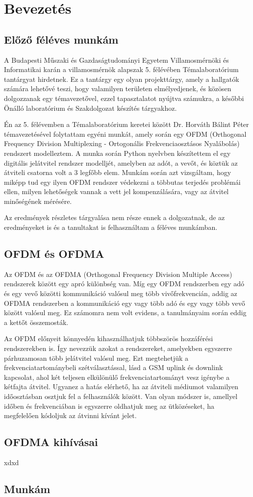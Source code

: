 \chapter{Bevezetés}

\section{Előző féléves munkám}

A Budapesti Műszaki és Gazdaságtudományi Egyetem Villamosmérnöki és Informatikai karán a villamosmérnök alapszak 5. félévében Témalaboratórium tantárgyat hirdetnek.
Ez a tantárgy egy olyan projekttárgy, amely a hallgatók számára lehetővé teszi, hogy valamilyen területen elmélyedjenek, és közösen dolgozzanak egy témavezetővel, ezzel tapasztalatot nyújtva számukra, a későbbi Önálló laboratórium és Szakdolgozat készítés tárgyakhoz.

Én az 5. félévemben a Témalaboratórium keretei között Dr. Horváth Bálint Péter témavezetésével folytattam egyéni munkát, amely során egy OFDM (Orthogonal Frequency Division Multiplexing - Ortogonális Frekvenciaosztásos Nyalábolás) rendszert modelleztem. A munka során Python nyelvben készítettem el egy digitális jelátvitel rendszer modelljét, amelyben az adót, a vevőt, és köztük az átviteli csatorna volt a 3 legfőbb elem. Munkám során azt vizsgáltam, hogy miképp tud egy ilyen OFDM rendszer védekezni a többutas terjedés problémái ellen, milyen lehetőségek vannak a vett jel kompenzálására, vagy az átvitel minőségének mérésére.

Az eredmények részletes tárgyalása nem része ennek a dolgozatnak, de az eredményeket is és a tanultakat is felhasználtam a féléves munkámban.

\section{OFDM és OFDMA}

Az OFDM és az OFDMA (Orthogonal Frequency Division Multiple Access) rendszerek között egy apró különbség van. Míg egy OFDM rendszerben egy adó és egy vevő közötti kommunikáció valósul meg több vivőfrekvencián, addig az OFDMA rendszerben a kommunikáció egy vagy több adó és egy vagy több vevő között valósul meg. Ez számomra nem volt evidens, a tanulmányaim során eddig a kettőt összemosták.

Az OFDM előnyeit könnyedén kihasználhatjuk többszörös hozzáférési rendszerekben is.
Így nevezzük azokat a rendszereket, amelyekben egyszerre párhuzamosan több jelátvitel valósul meg.
Ezt megtehetjük a frekvenciatartománybeli szétválasztással, lásd a GSM uplink és downlink kapcsolat, ahol két teljesen elkülönülő frekvenciatartományt vesz igénybe a kétfajta átvitel. 
Ugyanez a hatás elérhető, ha az átviteli médiumot valamilyen időosztásban osztjuk fel a felhasználók között. 
Van olyan módszer is, amellyel időben és frekvenciában is egyszerre oldhatjuk meg az ütközéseket, ha megfelelően kódoljuk az átvinni kívánt jelet.

\section{OFDMA kihívásai}

xdxd

\section{Munkám}